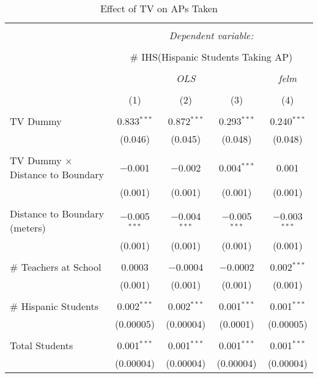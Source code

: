 
\begin{table}[!htbp] \centering 
  \caption{Effect of TV on APs Taken} 
  \label{} 
\begin{tabular}{@{\extracolsep{-2pt}}lcccc} 
\\[-1.8ex]\hline 
\hline \\[-1.8ex] 
 & \multicolumn{4}{c}{\textit{Dependent variable:}} \\ 
\cline{2-5} 
\\[-1.8ex] & \multicolumn{4}{c}{\# IHS(Hispanic Students Taking AP)} \\ 
\\[-1.8ex] & \multicolumn{3}{c}{\textit{OLS}} & \textit{felm} \\ 
\\[-1.8ex] & (1) & (2) & (3) & (4)\\ 
\hline \\[-1.8ex] 
 TV Dummy & 0.833$^{***}$ & 0.872$^{***}$ & 0.293$^{***}$ & 0.240$^{***}$ \\ 
  & (0.046) & (0.045) & (0.048) & (0.048) \\ 
  & & & & \\ 
 TV Dummy $\times$ Distance to Boundary & $-$0.001 & $-$0.002 & 0.004$^{***}$ & 0.001 \\ 
  & (0.001) & (0.001) & (0.001) & (0.001) \\ 
  & & & & \\ 
 Distance to Boundary (meters) & $-$0.005$^{***}$ & $-$0.004$^{***}$ & $-$0.005$^{***}$ & $-$0.003$^{***}$ \\ 
  & (0.001) & (0.001) & (0.001) & (0.001) \\ 
  & & & & \\ 
 \# Teachers at School & 0.0003 & $-$0.0004 & $-$0.0002 & 0.002$^{***}$ \\ 
  & (0.001) & (0.001) & (0.001) & (0.001) \\ 
  & & & & \\ 
 \# Hispanic Students & 0.002$^{***}$ & 0.002$^{***}$ & 0.001$^{***}$ & 0.001$^{***}$ \\ 
  & (0.00005) & (0.00004) & (0.0001) & (0.00005) \\ 
  & & & & \\ 
 Total Students & 0.001$^{***}$ & 0.001$^{***}$ & 0.001$^{***}$ & 0.001$^{***}$ \\ 
  & (0.00004) & (0.00004) & (0.00004) & (0.00004) \\ 

\end{tabular}
\end{table}
